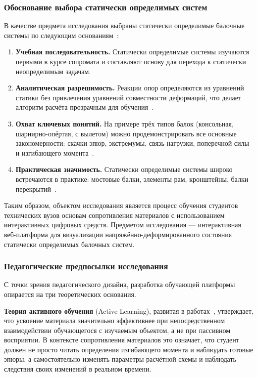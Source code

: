 \subsubsection{Обоснование выбора статически определимых систем}

В качестве предмета исследования выбраны статически определимые балочные системы по следующим основаниям~\cite{feodosev, aleksandrov}:

\begin{enumerate}
  \item \textbf{Учебная последовательность.} Статически определимые системы изучаются первыми в курсе сопромата и составляют основу для перехода к статически неопределимым задачам.
  \item \textbf{Аналитическая разрешимость.} Реакции опор определяются из уравнений статики без привлечения уравнений совместности деформаций, что делает алгоритм расчёта прозрачным для обучения~\cite{darkov}.
  \item \textbf{Охват ключевых понятий.} На примере трёх типов балок (консольная, шарнирно-опёртая, с вылетом) можно продемонстрировать все основные закономерности: скачки эпюр, экстремумы, связь нагрузки, поперечной силы и изгибающего момента~\cite{belyaev}.
  \item \textbf{Практическая значимость.} Статически определимые системы широко встречаются в практике: мостовые балки, элементы рам, кронштейны, балки перекрытий~\cite{gere2018, beer2020}.
\end{enumerate}

Таким образом, объектом исследования является процесс обучения студентов технических вузов основам сопротивления материалов с использованием интерактивных цифровых средств. Предметом исследования --- интерактивная веб-платформа для визуализации напряжённо-деформированного состояния статически определимых балочных систем.

\subsubsection{Педагогические предпосылки исследования}

С точки зрения педагогического дизайна, разработка обучающей платформы опирается на три теоретических основания.

\textbf{Теория активного обучения} (Active Learning), развитая в работах~\cite{freeman2014, makarenko}, утверждает, что усвоение материала значительно эффективнее при непосредственном взаимодействии обучающегося с изучаемым объектом, а не при пассивном восприятии. В контексте сопротивления материалов это означает, что студент должен не просто читать определения изгибающего момента и наблюдать готовые эпюры, а самостоятельно изменять параметры расчётной схемы и наблюдать следствия своих изменений в реальном времени.

